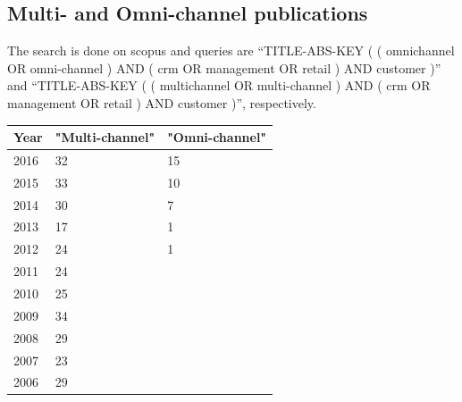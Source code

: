 \subsection{Multi- and Omni-channel publications}
\label{app:mcoc}
The search is done on scopus and queries are \enquote{TITLE-ABS-KEY ( ( omnichannel  OR  omni-channel )  AND  ( crm  OR  management  OR  retail )  AND  customer )} and \enquote{TITLE-ABS-KEY ( ( multichannel  OR  multi-channel )  AND  ( crm  OR  management  OR  retail )  AND  customer )}, respectively.

\begin{table}[caption={multi- and omni-channel publication comparison}, label=tab:crmnotioncomparison]
	\centering
	\begin{tabular}{p{1cm}| p{4cm} |p{4cm}    } 
	\textbf{Year} & \textbf{"Multi-channel"} & \textbf{"Omni-channel"} \\ \hline 
	2016          & 32            & 15                                                                       \\
	2015          & 33            & 10                                                                   \\
	2014          & 30            & 7                                                                   \\
	2013          & 17            & 1                                                           \\
	2012          & 24            & 1                                                              \\
	2011          & 24            &                                                       \\
	2010          & 25            &                                                                \\
	2009          & 34            &                                                       \\
	2008          & 29             &                                             \\
	2007          & 23            &                                                       \\
	2006 & 29         &                           					 \\
\end{tabular}
\end{table}

